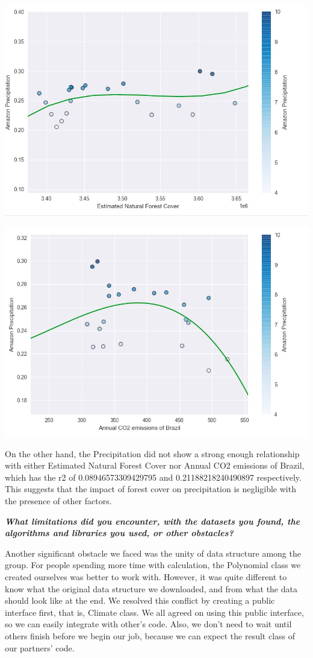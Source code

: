 \documentclass[12pt]{article}
\begin{document}
\begin{enumerate}
\begin{text}
\includegraphics[scale=0.5]{./precip-vs-forest.png}

\includegraphics[scale=0.5]{./precip-vs-co2.png}

On the other hand, the Precipitation did not show a strong enough relationship with either Estimated Natural Forest Cover nor Annual CO2 emissions of Brazil, which has the r2 of 0.08946573309429795 and 0.21188218240490897 respectively. This suggests that the impact of forest cover on precipitation is negligible with the presence of other factors.

\emph{\textbf{What limitations did you encounter, with the datasets you found, the algorithms and libraries you used, or other obstacles?}}

Another significant obstacle we faced was the unity of data structure among the group. For people spending more time with calculation, the Polynomial class we created ourselves was better to work with. However, it was quite different to know what the original data structure we downloaded, and from what the data should look like at the end. We resolved this conflict by creating a public interface first, that is, Climate class. We all agreed on using this public interface, so we can easily integrate with other's code. Also, we don't need to wait until others finish before we begin our job, because we can expect the result class of our partners' code.


\end{text}
\end{enumerate}
\end{document}
